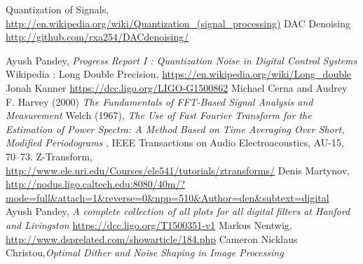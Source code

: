 \begin{thebibliography}{100}
 Quantization of Signals, \url{http://en.wikipedia.org/wiki/Quantization_(signal_processing)}
 DAC Denoising \url{http://github.com/rxa254/DACdenoising/}

 Ayush Pandey, \emph{Progress Report I : Quantization Noise in Digital Control Systems} 
 Wikipedia : Long Double Precision, \url{https://en.wikipedia.org/wiki/Long_double}
 Jonah Kanner \url{https://dcc.ligo.org/LIGO-G1500862}
 Michael Cerna and Audrey F. Harvey (2000) \emph{The Fundamentals of FFT-Based Signal Analysis and Measurement}
 Welch (1967),  \emph{The Use of Fast Fourier Transform for the Estimation of Power Spectra: A Method Based on Time Averaging Over Short, Modified Periodograms} , IEEE Transactions on Audio Electroacoustics, AU-15, 70–73.
 Z-Transform, \url{http://www.ele.uri.edu/Courses/ele541/tutorials/ztransforms/}
 Denis Martynov, \url{http://nodus.ligo.caltech.edu:8080/40m/?mode=full&attach=1&reverse=0&npp=510&Author=den&subtext=digital}  
 Ayush Pandey, \emph{A complete collection of all plots for all digital filters at Hanford and Livingston}
\url{https://dcc.ligo.org/T1500351-v1}
 Markus Nentwig, \url{http://www.dsprelated.com/showarticle/184.php}
Cameron Nicklaus Christou,\emph{Optimal Dither and Noise Shaping in Image Processing}
\end{thebibliography}  